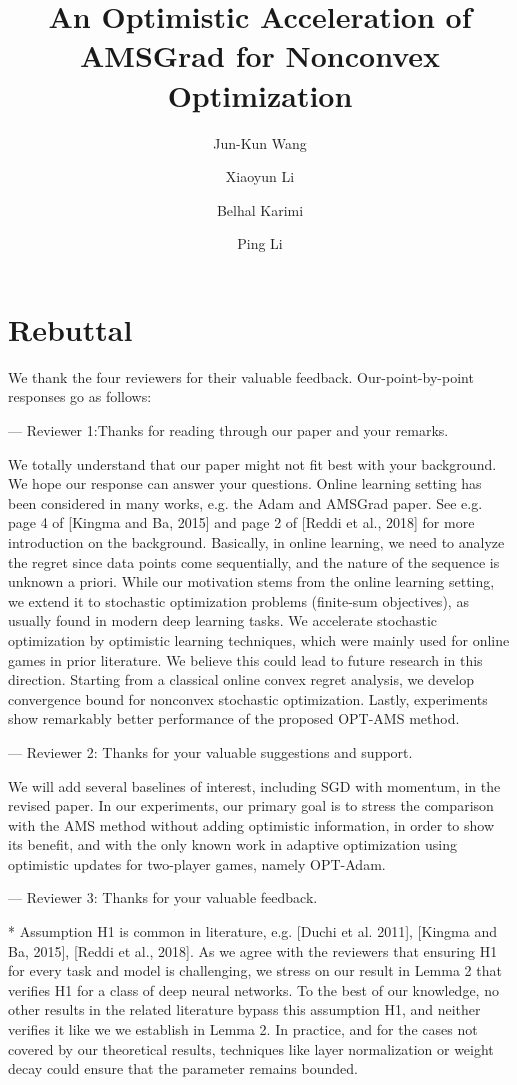 \documentclass{article}
\title{An Optimistic Acceleration of AMSGrad for Nonconvex Optimization}
\author{Jun-Kun Wang \and Xiaoyun Li \and Belhal Karimi \and Ping Li}
\date{}
\begin{document}
\maketitle

\section{Rebuttal}

We thank the four reviewers for their valuable feedback. 
Our-point-by-point responses go as follows:


--- Reviewer 1:Thanks for reading through our paper and your remarks. 

We totally understand that our paper might not fit best with your background. We hope our response can answer your questions.
Online learning setting has been considered in many works, e.g. the Adam and AMSGrad paper. See e.g. page 4 of [Kingma and Ba, 2015] and page 2 of [Reddi et al., 2018] for more introduction on the background. 
Basically, in online learning, we need to analyze the regret since data points come sequentially, and the nature of the sequence is unknown a priori. 
While our motivation stems from the online learning setting, we extend it to stochastic optimization problems (finite-sum objectives), as usually found in modern deep learning tasks. 
We accelerate stochastic optimization by optimistic learning techniques, which were mainly used for online games in prior literature. 
We believe this could lead to future research in this direction. 
Starting from a classical online convex regret analysis, we develop convergence bound for nonconvex stochastic optimization. 
Lastly, experiments show remarkably better performance of the proposed OPT-AMS method.



--- Reviewer 2: Thanks for your valuable suggestions and support. 

We will add several baselines of interest, including SGD with momentum, in the revised paper. 
In our experiments, our primary goal is to stress the comparison with the AMS method without adding optimistic information, in order to show its benefit, and with the only known work in adaptive optimization using optimistic updates for two-player games, namely OPT-Adam.


--- Reviewer 3: Thanks for your valuable feedback.

* Assumption H1 is common in literature, e.g. [Duchi et al. 2011], [Kingma and Ba, 2015], [Reddi et al., 2018].
As we agree with the reviewers that ensuring H1 for every task and model is challenging, we stress on our result in Lemma 2 that verifies H1 for a class of deep neural networks. 
To the best of our knowledge, no other results in the related literature bypass this assumption H1, and neither verifies it like we we establish in Lemma 2. 
In practice, and for the cases not covered by our theoretical results, techniques like layer normalization or weight decay could ensure that the parameter remains bounded.
\end{document}
